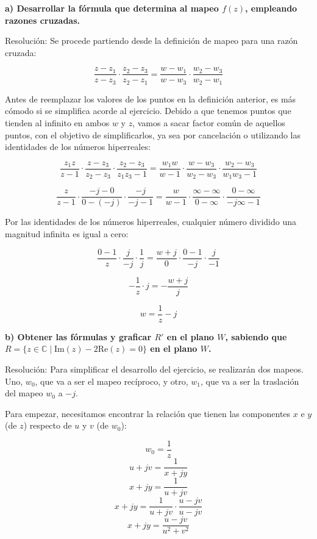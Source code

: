 \documentclass[12pt]{report}
\begin{document}
\textbf{a) Desarrollar la fórmula que determina al mapeo \( f(z) \), empleando razones cruzadas.}

Resolución: Se procede partiendo desde la definición de mapeo para una razón cruzada:

$$ \frac{z - z_1}{z - z_3} \cdot \frac{z_2 - z_3}{z_2 - z_1} = \frac{w - w_1}{w - w_3} \cdot \frac{w_2 - w_3}{w_2 - w_1} $$

Antes de reemplazar los valores de los puntos en la definición anterior, es más cómodo si se simplifica acorde al ejercicio. Debido a que tenemos puntos que tienden al infinito en ambos \( w \) y \( z \), vamos a sacar factor común de aquellos puntos, con el objetivo de simplificarlos, ya sea por cancelación o utilizando las identidades de los números hiperreales:

$$ \frac{z_1z}{z - 1} \cdot \frac{z - z_3}{z_2 - z_3} \cdot \frac{z_2 - z_3}{z_1z_3 - 1} = \frac{w_1w}{w - 1} \cdot \frac{w - w_3}{w_2 - w_3} \cdot \frac{w_2 - w_3}{w_1w_3 - 1} $$

$$ \frac{z}{z - 1} \cdot \frac{-j - 0}{0 - (-j)} \cdot \frac{-j}{-j - 1} = \frac{w}{w - 1} \cdot \frac{\infty - \infty}{0 - \infty} \cdot \frac{0 - \infty}{-j\infty - 1} $$

Por las identidades de los números hiperreales, cualquier número dividido una magnitud infinita es igual a cero:

$$ \frac{0 - 1}{z} \cdot \frac{j}{-j} \cdot \frac{1}{j} = \frac{w + j}{0} \cdot \frac{0 - 1}{-j} \cdot \frac{j}{-1} $$

$$ - \frac{1}{z} \cdot j = - \frac{w + j}{j} $$

$$ w = \frac{1}{z} - j $$

\textbf{b) Obtener las fórmulas y graficar \( R' \) en el plano \( W \), sabiendo que \( R = \{z \in \mathbb{C} \mid \text{Im}(z) - 2\text{Re}(z) = 0\} \) en el plano \( W \).}

Resolución: Para simplificar el desarrollo del ejercicio, se realizarán dos mapeos. Uno, \( w_0 \), que va a ser el mapeo recíproco, y otro, \( w_1 \), que va a ser la traslación del mapeo \( w_0 \) a \( -j \).

Para empezar, necesitamos encontrar la relación que tienen las componentes \( x \) e \( y \) (de \( z \)) respecto de \( u \) y \( v \) (de \( w_0 \)):

$$ w_0 = \frac{1}{z} $$
$$ u + jv = \frac{1}{x + jy} $$
$$ x + jy = \frac{1}{u + jv} $$
$$ x + jy = \frac{1}{u + jv} \cdot \frac{u - jv}{u - jv} $$
$$ x + jy = \frac{u - jv}{u^2 + v^2} $$
\end{document}
